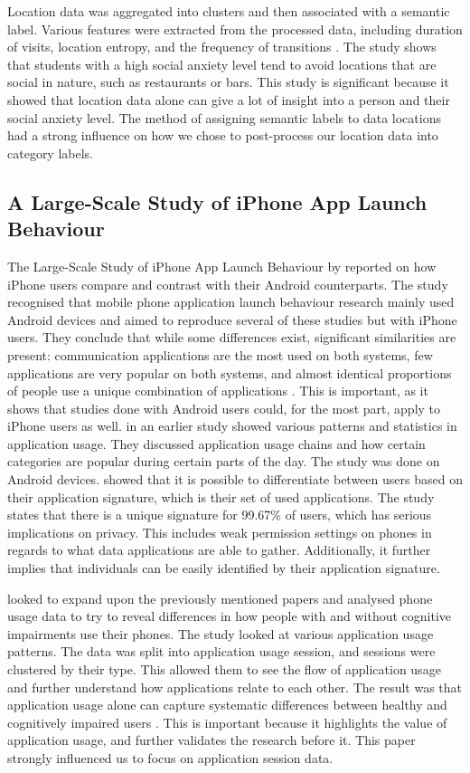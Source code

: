 \documentclass{l4proj}
\begin{document}
Location data was aggregated into clusters and then associated with a semantic label. Various features were extracted from the processed data, including duration of visits, location entropy, and the frequency of transitions \citep{boukhechba_2}. The study shows that students with a high social anxiety level tend to avoid locations that are social in nature, such as restaurants or bars. This study is significant because it showed that location data alone can give a lot of insight into a person and their social anxiety level. The method of assigning semantic labels to data locations had a strong influence on how we chose to post-process our location data into category labels.

\subsection{A Large-Scale Study of iPhone App Launch Behaviour} %
The Large-Scale Study of iPhone App Launch Behaviour by \citet{apptracker} reported on how iPhone users compare and contrast with their Android counterparts. The study recognised that mobile phone application launch behaviour research mainly used Android devices and aimed to reproduce several of these studies but with iPhone users. They conclude that while some differences exist, significant similarities are present: communication applications are the most used on both systems, few applications are very popular on both systems, and almost identical proportions of people use a unique combination of applications \citep{apptracker}. This is important, as it shows that studies done with Android users could, for the most part, apply to iPhone users as well. \citet{angry_birds_study} in an earlier study showed various patterns and statistics in application usage. They discussed application usage chains and how certain categories are popular during certain parts of the day. The study was done on Android devices. \citet{welke} showed that it is possible to differentiate between users based on their application signature, which is their set of used applications. The study states that there is a unique signature for 99.67\% of users, which has serious implications on privacy. This includes weak permission settings on phones in regards to what data applications are able to gather. Additionally, it further implies that individuals can be easily identified by their application signature.

\citet{apple_patterns} looked to expand upon the previously mentioned papers and analysed phone usage data to try to reveal differences in how people with and without cognitive impairments use their phones. The study looked at various application usage patterns. The data was split into application usage session, and sessions were clustered by their type. This allowed them to see the flow of application usage and further understand how applications relate to each other. The result was that application usage alone can capture systematic differences between healthy and cognitively impaired users \citep{apple_patterns}. This is important because it highlights the value of application usage, and further validates the research before it. This paper strongly influenced us to focus on application session data.
\end{document}
